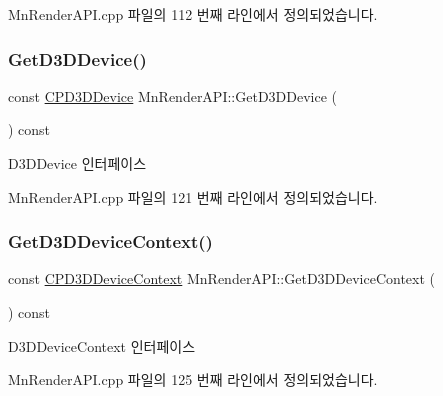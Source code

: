 Mn\+Render\+A\+P\+I.\+cpp 파일의 112 번째 라인에서 정의되었습니다.

\mbox{\label{class_m_n_l_1_1_mn_render_a_p_i_af7dac77c07b794fc4ff298db83f0d84d}} 
\subsubsection{\texorpdfstring{Get\+D3\+D\+Device()}{GetD3DDevice()}}
{\footnotesize\ttfamily const \hyperlink{namespace_m_n_l_a1eec210db8f309a4a9ac0d9658784c31}{C\+P\+D3\+D\+Device} Mn\+Render\+A\+P\+I\+::\+Get\+D3\+D\+Device (\begin{DoxyParamCaption}{ }\end{DoxyParamCaption}) const}



D3\+D\+Device 인터페이스 



Mn\+Render\+A\+P\+I.\+cpp 파일의 121 번째 라인에서 정의되었습니다.

\mbox{\label{class_m_n_l_1_1_mn_render_a_p_i_a945fe3f0b1b917376ea3dbfd051c7fe7}} 
\subsubsection{\texorpdfstring{Get\+D3\+D\+Device\+Context()}{GetD3DDeviceContext()}}
{\footnotesize\ttfamily const \hyperlink{namespace_m_n_l_aab3aabb6c9360e44ddc8b0bb563c2107}{C\+P\+D3\+D\+Device\+Context} Mn\+Render\+A\+P\+I\+::\+Get\+D3\+D\+Device\+Context (\begin{DoxyParamCaption}{ }\end{DoxyParamCaption}) const}



D3\+D\+Device\+Context 인터페이스 



Mn\+Render\+A\+P\+I.\+cpp 파일의 125 번째 라인에서 정의되었습니다.

